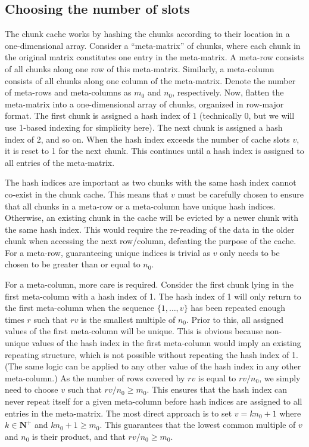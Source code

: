 \documentclass{article}
\begin{document}
\subsection{Choosing the number of slots}
\label{sec:slotchoice}
The chunk cache works by hashing the chunks according to their location in a one-dimensional array.
Consider a ``meta-matrix'' of chunks, where each chunk in the original matrix constitutes one entry in the meta-matrix.
A meta-row consists of all chunks along one row of this meta-matrix.
Similarly, a meta-column consists of all chunks along one column of the meta-matrix. 
Denote the number of meta-rows and meta-columns as $m_0$ and $n_0$, respectively.
Now, flatten the meta-matrix into a one-dimensional array of chunks, organized in row-major format.
The first chunk is assigned a hash index of 1 (technically 0, but we will use 1-based indexing for simplicity here).
The next chunk is assigned a hash index of 2, and so on.
When the hash index exceeds the number of cache slots $v$, it is reset to 1 for the next chunk.
This continues until a hash index is assigned to all entries of the meta-matrix.

The hash indices are important as two chunks with the same hash index cannot co-exist in the chunk cache.
This means that $v$ must be carefully chosen to ensure that all chunks in a meta-row or a meta-column have unique hash indices.
Otherwise, an existing chunk in the cache will be evicted by a newer chunk with the same hash index.
This would require the re-reading of the data in the older chunk when accessing the next row/column, defeating the purpose of the cache.
For a meta-row, guaranteeing unique indices is trivial as $v$ only needs to be chosen to be greater than or equal to $n_0$.

For a meta-column, more care is required.
Consider the first chunk lying in the first meta-column with a hash index of 1.
The hash index of 1 will only return to the first meta-column when the sequence $\{1, \ldots, v\}$ has been repeated enough times $r$ such that $rv$ is the smallest multiple of $n_0$.
Prior to this, all assigned values of the first meta-column will be unique.
This is obvious because non-unique values of the hash index in the first meta-column would imply an existing repeating structure, which is not possible without repeating the hash index of 1.
(The same logic can be applied to any other value of the hash index in any other meta-column.)
As the number of rows covered by $rv$ is equal to $rv/n_0$, we simply need to choose $v$ such that $rv/n_0 \ge m_0$.
This ensures that the hash index can never repeat itself for a given meta-column before hash indices are assigned to all entries in the meta-matrix.
The most direct approach is to set $v = kn_0 + 1$  where $k \in \mathbf{N}^+$ and $kn_0 +1 \ge m_0$.
This guarantees that the lowest common multiple of $v$ and $n_0$ is their product, and that $rv/n_0 \ge m_0$.
\end{document}
